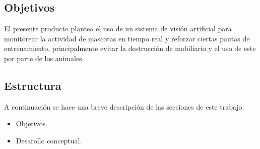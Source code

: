 \subsection{Objetivos}

El presente producto plantea el uso de un sistema de visión artificial para monitorear la actividad de mascotas en tiempo real y reforzar ciertas pautas de entrenamiento, principalmente evitar la destrucción de mobiliario y el uso de este por parte de los animales. 

\subsection{Estructura}

A continuación se hace una breve descripción de las secciones de este trabajo.

\begin{itemize}
  \item Objetivos.
  \item Desarollo conceptual.
\end{itemize}


